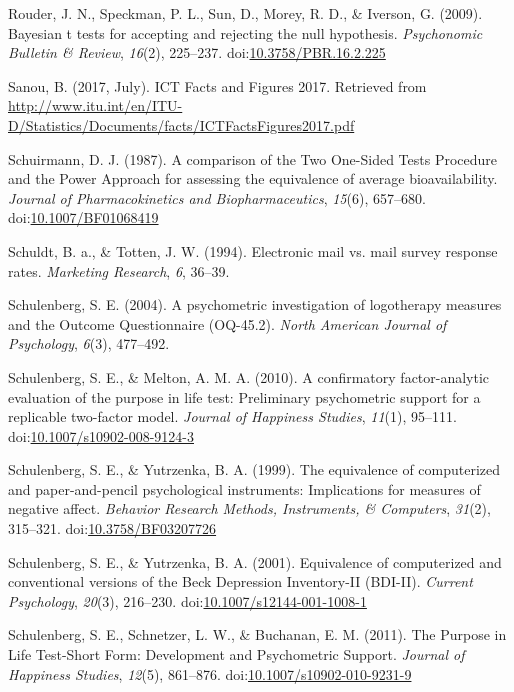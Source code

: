 \documentclass[english,man, mask]{apa6}
\theoremstyle{definition}
\theoremstyle{definition}
\theoremstyle{definition}
\theoremstyle{remark}
\begin{document}
\hypertarget{ref-Rouder2009}{}
Rouder, J. N., Speckman, P. L., Sun, D., Morey, R. D., \& Iverson, G.
(2009). Bayesian t tests for accepting and rejecting the null
hypothesis. \emph{Psychonomic Bulletin \& Review}, \emph{16}(2),
225--237.
doi:\href{https://doi.org/10.3758/PBR.16.2.225}{10.3758/PBR.16.2.225}

\hypertarget{ref-Sanou2017}{}
Sanou, B. (2017, July). ICT Facts and Figures 2017. Retrieved from
\url{http://www.itu.int/en/ITU-D/Statistics/Documents/facts/ICTFactsFigures2017.pdf}

\hypertarget{ref-Schuirmann1987}{}
Schuirmann, D. J. (1987). A comparison of the Two One-Sided Tests
Procedure and the Power Approach for assessing the equivalence of
average bioavailability. \emph{Journal of Pharmacokinetics and
Biopharmaceutics}, \emph{15}(6), 657--680.
doi:\href{https://doi.org/10.1007/BF01068419}{10.1007/BF01068419}

\hypertarget{ref-Schuldt1994}{}
Schuldt, B. a., \& Totten, J. W. (1994). Electronic mail vs. mail survey
response rates. \emph{Marketing Research}, \emph{6}, 36--39.

\hypertarget{ref-Schulenberg2004}{}
Schulenberg, S. E. (2004). A psychometric investigation of logotherapy
measures and the Outcome Questionnaire (OQ-45.2). \emph{North American
Journal of Psychology}, \emph{6}(3), 477--492.

\hypertarget{ref-Schulenberg2010}{}
Schulenberg, S. E., \& Melton, A. M. A. (2010). A confirmatory
factor-analytic evaluation of the purpose in life test: Preliminary
psychometric support for a replicable two-factor model. \emph{Journal of
Happiness Studies}, \emph{11}(1), 95--111.
doi:\href{https://doi.org/10.1007/s10902-008-9124-3}{10.1007/s10902-008-9124-3}

\hypertarget{ref-Schulenberg1999}{}
Schulenberg, S. E., \& Yutrzenka, B. A. (1999). The equivalence of
computerized and paper-and-pencil psychological instruments:
Implications for measures of negative affect. \emph{Behavior Research
Methods, Instruments, \& Computers}, \emph{31}(2), 315--321.
doi:\href{https://doi.org/10.3758/BF03207726}{10.3758/BF03207726}

\hypertarget{ref-Schulenberg2001}{}
Schulenberg, S. E., \& Yutrzenka, B. A. (2001). Equivalence of
computerized and conventional versions of the Beck Depression
Inventory-II (BDI-II). \emph{Current Psychology}, \emph{20}(3),
216--230.
doi:\href{https://doi.org/10.1007/s12144-001-1008-1}{10.1007/s12144-001-1008-1}

\hypertarget{ref-Schulenberg2011}{}
Schulenberg, S. E., Schnetzer, L. W., \& Buchanan, E. M. (2011). The
Purpose in Life Test-Short Form: Development and Psychometric Support.
\emph{Journal of Happiness Studies}, \emph{12}(5), 861--876.
doi:\href{https://doi.org/10.1007/s10902-010-9231-9}{10.1007/s10902-010-9231-9}
\end{document}
